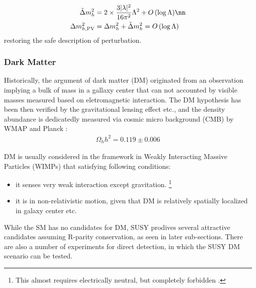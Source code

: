 \begin{align}
\tilde{\Delta} m_h ^2 & =  2 \times \frac{3|\lambda|^2}{16\pi^2} \Lambda^2 + O\,(\log\Lambda) \nn \\
\Delta m^2_{h, \mathrm{PV}} 
&  = \Delta m_h ^2 + \tilde{\Delta} m_h ^2  = O\,(\log\Lambda)
\label{eq::naturalness2}
\end{align}
restoring the safe description of perturbation. \\



\subsubsection{Dark Matter}
Historically, the argument of dark matter (DM) originated from an observation implying a bulk of mass in a gallaxy center that can not accounted by visible masses measured based on eletromagnetic interaction. The DM hypothesis has been then verified by the gravitational lensing effect etc., and the density abundance is dedicatedly measured via cosmic micro background (CMB) by WMAP \cite{WMAP2013} and Planck \cite{Planck2015}:
\begin{align}
\Omega_h h^2 = 0.119 \pm 0.006 
\end{align}

DM is usually considered in the framework in Weakly Interacting Massive Particles (WIMPs) 
that satisfying following conditions: 
\begin{itemize}
\item it senses very weak interaction except gravitation. 
\footnote{This almost requires electrically neutral, but completely forbidden \cite{chargedDM}.}
\item it is in non-relativistic motion, given that DM is relatively spatially localized in galaxy center etc.
\end{itemize}
While the SM has no candidates for DM, SUSY prodives several attractive candidates assuming R-parity conservation, as seen in later sub-sections. 
There are also a number of experiments for direct detection, in which the SUSY DM scenario can be tested. \\



